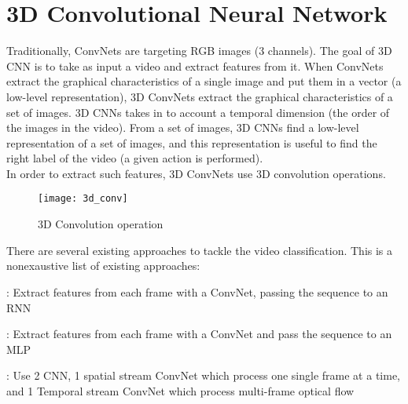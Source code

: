 \documentclass{report}
\begin{document}
\section {3D Convolutional Neural Network}
Traditionally, ConvNets are targeting RGB images (3 channels). The goal of 3D CNN is to take as input a video and extract features from it.
When ConvNets extract the graphical characteristics of a single image and put them in a vector (a low-level representation), 3D ConvNets
extract the graphical characteristics of a set of images. 3D CNNs takes in to account a temporal dimension (the order of the images in the
video). From a set of images, 3D CNNs find a low-level representation of a set of images, and this representation is useful to find the
right label of the video (a given action is performed). \\
In order to extract such features, 3D ConvNets  use 3D convolution operations.

\begin{figure}[h]
  \centering
  \texttt{[image: 3d\_conv]}
  \caption{3D Convolution operation}
\end{figure}

There are several existing approaches to tackle the video classification. This is a nonexaustive list of existing approaches:
\begin{description} [font=$\bullet$\scshape\bfseries]
\item[ ConvNets + LSTM cell] : Extract features from each frame with a ConvNet, passing the sequence to an RNN
\item[ Temporal Relation Networks] : Extract features from each frame with a ConvNet and pass the sequence to an MLP
\item[ Two-Stream Convolutional Networks] : Use 2 CNN, 1 spatial stream ConvNet which process one single frame at a time, and 1 Temporal stream ConvNet which process multi-frame optical flow
\end{description}
\end{document}
